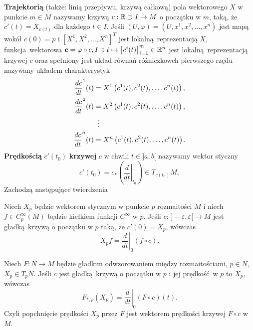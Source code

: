 \textbf{Trajektorią} (także: linią przepływu, krzywą całkową) pola wektorowego \(X\) w punkcie \(m\in M\) nazywamy krzywą \(c: \mathbb{R} \supset I \rightarrow M\) o początku w \(m\), taką, że \(c'(t) = X_{c(t)}\) dla każdego \(t\in I\). Jeśli \((U, \varphi) = (U, x^1, x^2, \dots, x^n)\) jest mapą wokół \(c(0)=p\) i \([X^1, X^2, \dots, X^n]^T\) jest lokalną reprezentacją \(X\), funkcja wektorowa \(\mathbf{c} = \varphi \circ c, I \ni t \mapsto \left[c^i(t)\right]_{i=1}^m \in \mathbb{R}^n\) jest lokalną reprezentacją krzywej \(c\) oraz spełniony jest układ równań różniczkowch pierwszego rzędu nazywany układem charakterystyk
\begin{align*}
    \frac{dc}{dt}^1(t) &= X^1\left(c^1(t), c^2(t), \dots, c^n(t)\right),\\
    \frac{dc}{dt}^2(t) &= X^2\left(c^1(t), c^2(t), \dots, c^n(t)\right),\\
    &\mathrel{\makebox[\widthof{=}]{\vdots}}  \\
    \frac{dc}{dt}^n(t) &= X^n\left(c^1(t), c^2(t), \dots, c^n(t)\right).
\end{align*}
\textbf{Prędkością} \(c'(t_0)\) \textbf{krzywej} \(c\) w chwili \(t\in]a, b[\) nazywamy wektor styczny
\begin{equation}
c'(t_0) = c_\ast\left(\left.\frac{d}{dt}\right|_{t_0}\right)\in T_{c(t_0)}M,
\end{equation}
Zachodzą następujące twierdzenia
\begin{twierdzenie}
Niech \(X_p\) będzie wektorem stycznym w punkcie \(p\) rozmaitości \(M\) i niech \(f\in C_p^\infty(M)\) będzie kiełkiem funkcji \(C^\infty\) w \(p\). Jeśli \(c:\:]-\varepsilon,\varepsilon[\rightarrow M\) jest gładką krzywą o początku w \(p\) taką, że \(c'(0)=X_p\), wówczas
\begin{equation}
X_pf=\left.\frac{d}{dt}\right|_0(f\circ c).
\end{equation}
\end{twierdzenie}
\begin{twierdzenie}
Niech \(F: N\to M\) będzie gładkim odwzorowaniem między rozmaitościami, \(p\in N\), \(X_p\in T_p N\). Jeśli \(c\) jest gładką krzywą o początku w \(p\) i jej prędkość w \(p\) to \(X_p\), wówczas
\begin{equation}
F_{\ast, p} (X_p) = \left.\frac{d}{dt}\right|_0(F\circ c)(t).
\end{equation}
Czyli popchnięcie prędkości \(X_p\) przez \(F\) jest wektorem prędkości krzywej \(F\circ c\) w \(M\).
\end{twierdzenie}

